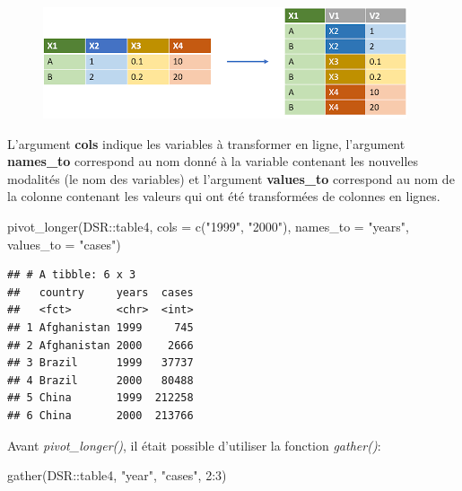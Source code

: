 \documentclass[
]{book}
\newenvironment{Shaded}{\begin{snugshade}}{\end{snugshade}}
\newcommand{\AttributeTok}[1]{\textcolor[rgb]{0.77,0.63,0.00}{#1}}
\newcommand{\DecValTok}[1]{\textcolor[rgb]{0.00,0.00,0.81}{#1}}
\newcommand{\FunctionTok}[1]{\textcolor[rgb]{0.00,0.00,0.00}{#1}}
\newcommand{\NormalTok}[1]{#1}
\newcommand{\SpecialCharTok}[1]{\textcolor[rgb]{0.00,0.00,0.00}{#1}}
\newcommand{\StringTok}[1]{\textcolor[rgb]{0.31,0.60,0.02}{#1}}
\theoremstyle{definition}
\theoremstyle{definition}
\theoremstyle{definition}
\theoremstyle{definition}
\theoremstyle{remark}
\begin{document}
\begin{figure}
\includegraphics[width=0.8\linewidth,height=\textheight]{Figures/pivot_longer} \end{figure}

L'argument \textbf{cols} indique les variables à transformer en ligne, l'argument \textbf{names\_to} correspond au nom donné à la variable contenant les nouvelles modalités (le nom des variables) et l'argument \textbf{values\_to} correspond au nom de la colonne contenant les valeurs qui ont été transformées de colonnes en lignes.

\begin{Shaded}
\begin{Highlighting}[]
\FunctionTok{pivot\_longer}\NormalTok{(DSR}\SpecialCharTok{::}\NormalTok{table4, }
             \AttributeTok{cols =} \FunctionTok{c}\NormalTok{(}\StringTok{"1999"}\NormalTok{, }\StringTok{"2000"}\NormalTok{),}
             \AttributeTok{names\_to =} \StringTok{"years"}\NormalTok{,}
             \AttributeTok{values\_to =} \StringTok{"cases"}\NormalTok{)}
\end{Highlighting}
\end{Shaded}

\begin{verbatim}
## # A tibble: 6 x 3
##   country     years  cases
##   <fct>       <chr>  <int>
## 1 Afghanistan 1999     745
## 2 Afghanistan 2000    2666
## 3 Brazil      1999   37737
## 4 Brazil      2000   80488
## 5 China       1999  212258
## 6 China       2000  213766
\end{verbatim}

Avant \emph{pivot\_longer()}, il était possible d'utiliser la fonction \emph{gather()}:

\begin{Shaded}
\begin{Highlighting}[]
\FunctionTok{gather}\NormalTok{(DSR}\SpecialCharTok{::}\NormalTok{table4, }\StringTok{"year"}\NormalTok{, }\StringTok{"cases"}\NormalTok{, }\DecValTok{2}\SpecialCharTok{:}\DecValTok{3}\NormalTok{)}
\end{Highlighting}
\end{Shaded}
\end{document}
